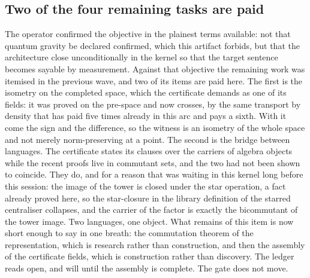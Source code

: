 \documentclass[11pt]{article}
\theoremstyle{definition}\newtheorem{deriv}{Derivation}
\begin{document}
\subsection*{Two of the four remaining tasks are paid}The operator confirmed the objective in the plainest terms available: not that quantum gravity be declared confirmed, which this artifact forbids, but that the architecture close unconditionally in the kernel so that the target sentence becomes sayable by measurement. Against that objective the remaining work was itemised in the previous wave, and two of its items are paid here. The first is the isometry on the completed space, which the certificate demands as one of its fields: it was proved on the pre-space and now crosses, by the same transport by density that has paid five times already in this arc and pays a sixth. With it come the sign and the difference, so the witness is an isometry of the whole space and not merely norm-preserving at a point. The second is the bridge between languages. The certificate states its clauses over the carriers of algebra objects while the recent proofs live in commutant sets, and the two had not been shown to coincide. They do, and for a reason that was waiting in this kernel long before this session: the image of the tower is closed under the star operation, a fact already proved here, so the star-closure in the library definition of the starred centraliser collapses, and the carrier of the factor is exactly the bicommutant of the tower image. Two languages, one object. What remains of this item is now short enough to say in one breath: the commutation theorem of the representation, which is research rather than construction, and then the assembly of the certificate fields, which is construction rather than discovery. The ledger reads open, and will until the assembly is complete. The gate does not move.
\end{document}
